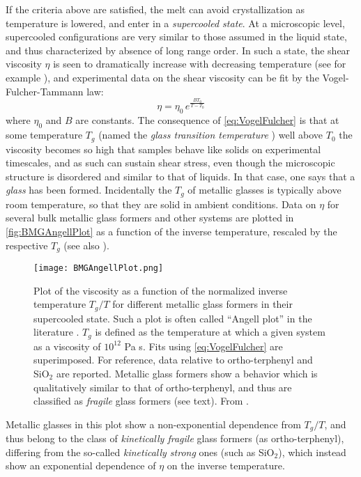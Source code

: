 If the criteria above are satisfied, the melt can avoid crystallization as temperature is lowered, and enter in a \emph{supercooled state}. At a microscopic level, supercooled configurations are very similar to those assumed in the liquid state, and thus characterized by absence of long range order. In such a state, the shear viscosity $\eta$ is seen to dramatically increase with decreasing temperature (see for example \cite{bakke1995viscosity}), and experimental data on the shear viscosity can be fit by the Vogel-Fulcher-Tammann law:
\begin{equation}
	\eta = \eta_{0}\, e^{\frac{B T_{0}}{T-T_{0}}}
	\label{eq:VogelFulcher}
\end{equation}
where $\eta_{0}$ and $B$ are constants. 
The consequence of \autoref{eq:VogelFulcher} is that at some temperature $T_{g}$ (named the \emph{glass transition temperature} \cite{ediger1996supercooled}) well above $T_{0}$ the viscosity becomes so high that samples behave like solids on experimental timescales, and as such can sustain shear stress, even though the microscopic structure is disordered and similar to that of liquids. In that case, one says that a \emph{glass} has been formed. Incidentally the $T_{g}$ of metallic glasses is typically above room temperature, so that they are solid in ambient conditions. 
Data on $\eta$ for several bulk metallic glass formers and other systems are plotted in \autoref{fig:BMGAngellPlot} as a function of the inverse temperature, rescaled by the respective $T_{g}$ (see also \cite{ediger1996supercooled}). 
\begin{figure} 
\centering 
\texttt{[image: BMGAngellPlot.png]} 
\caption{Plot of the viscosity as a function of the normalized inverse temperature $T_{g}/T$ for different metallic glass formers in their supercooled state. Such a plot is often called ``Angell plot'' in the literature \cite{debenedetti2001supercooled}. $T_{g}$ is defined as the temperature at which a given system as a viscosity of $10^{12}$ Pa s. Fits using \autoref{eq:VogelFulcher} are superimposed. For reference, data relative to ortho-terphenyl and SiO$_{2}$ are reported. Metallic glass formers show a behavior which is qualitatively similar to that of ortho-terphenyl, and thus are classified as \emph{fragile} glass formers (see text). From \cite{busch2007thermodynamics}. \label{fig:BMGAngellPlot}}
\end{figure}
Metallic glasses in this plot show a non-exponential dependence from $T_{g}/T$, and thus belong to the class of \emph{kinetically fragile} glass formers (as ortho-terphenyl), differing from the so-called \emph{kinetically strong} ones (such as SiO$_{2}$), which instead show an exponential dependence of $\eta$ on the inverse temperature. \\
